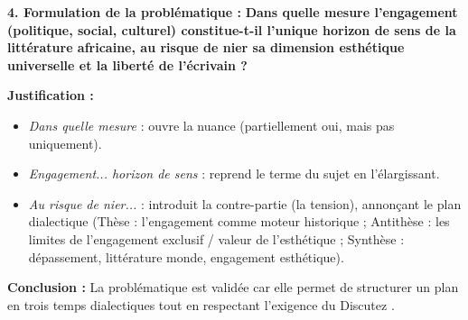 \documentclass[11pt]{article}
\begin{document}
\begin{exoresolu}
\textbf{4. Formulation de la problématique :}
\og \textbf{Dans quelle mesure l'engagement (politique, social, culturel) constitue-t-il l'unique horizon de sens de la littérature africaine, au risque de nier sa dimension esthétique universelle et la liberté de l'écrivain ?} \fg

\textbf{Justification :}
\begin{itemize}
    \item \emph{Dans quelle mesure} : ouvre la nuance (partiellement oui, mais pas uniquement).
    \item \emph{Engagement... horizon de sens} : reprend le terme du sujet en l'élargissant.
    \item \emph{Au risque de nier...} : introduit la contre-partie (la tension), annonçant le plan dialectique (Thèse : l'engagement comme moteur historique ; Antithèse : les limites de l'engagement exclusif / valeur de l'esthétique ; Synthèse : dépassement, littérature monde, engagement esthétique).
\end{itemize}

\textbf{Conclusion :} La problématique est validée car elle permet de structurer un plan en trois temps dialectiques tout en respectant l'exigence du \og Discutez \fg.
\end{exoresolu}
\end{document}
